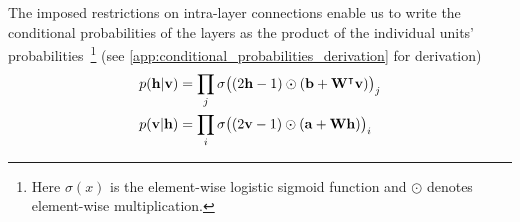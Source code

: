 The imposed restrictions on intra-layer connections enable us to write the conditional probabilities of the layers as the product of the individual units' probabilities~\footnote{Here \( \sigma(x) \) is the element-wise logistic sigmoid function and \( \odot \) denotes element-wise multiplication.} (see \cref{app:conditional_probabilities_derivation} for derivation)
\begin{align}
\begin{split}
    p(\mathbf{h} | \mathbf{v})
        &= \prod_j \sigma\big( (2\mathbf{h} - 1) \odot (\mathbf{b} + \mathbf{W}^\intercal\mathbf{v}) \big)_j \\
    p(\mathbf{v} | \mathbf{h})
        &= \prod_i \sigma\big( (2\mathbf{v} - 1) \odot (\mathbf{a} + \mathbf{W}\mathbf{h}) \big)_i
\end{split}
\end{align}

